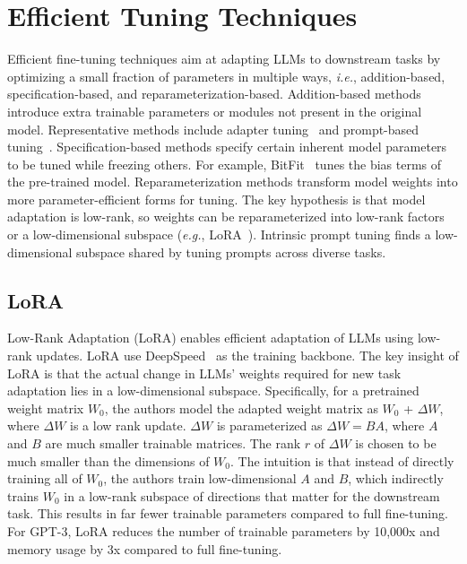 \documentclass[11pt]{article}
\begin{document}
\section{Efficient Tuning Techniques} \label{Efficient_fine-tuning_techniques}

Efficient fine-tuning techniques aim at adapting LLMs to downstream tasks by optimizing a small fraction of parameters in multiple ways, \textit{i.e.}, addition-based, specification-based, and reparameterization-based.
Addition-based methods introduce extra trainable parameters or modules not present in the original model. Representative methods include adapter tuning~\citep{DBLP:conf/icml/HoulsbyGJMLGAG19} and prompt-based tuning~\citep{DBLP:conf/eacl/SchickS21}. Specification-based methods specify certain inherent model parameters to be tuned while freezing others. For example, BitFit~\citep{DBLP:conf/acl/ZakenGR22} tunes the bias terms of the pre-trained model. Reparameterization methods transform model weights into more parameter-efficient forms for tuning. The key hypothesis is that model adaptation is low-rank, so weights can be reparameterized into low-rank factors or a low-dimensional subspace (\textit{e.g.}, LoRA~\citep{hu2021lora}). Intrinsic prompt tuning finds a low-dimensional subspace shared by tuning prompts across diverse tasks. 
\subsection{LoRA}
 Low-Rank Adaptation (LoRA) \cite{hu2021lora} enables efficient adaptation of LLMs using low-rank updates. LoRA use DeepSpeed~\citep{rasley2020deepspeed} as the training backbone.
     The key insight of LoRA is that the actual change in LLMs' weights required for new task adaptation lies in a low-dimensional subspace. 
    Specifically, for a pretrained weight matrix $W_0$, the authors model the adapted weight matrix as $W_0$ + $\Delta W$, where $\Delta W$ is a low rank update. $\Delta W$ is parameterized as $\Delta W = BA$, where $A$ and $B$ are much smaller trainable matrices. The rank $r$ of $\Delta W$ is chosen to be much smaller than the dimensions of $W_0$. 
    The intuition is that instead of directly training all of $W_0$, the authors train low-dimensional $A$ and $B$, which indirectly trains $W_0$ in a low-rank subspace of directions that matter for the downstream task. This results in far fewer trainable parameters compared to full fine-tuning.
    For GPT-3, LoRA reduces the number of trainable parameters by 10,000x and memory usage by 3x compared to full fine-tuning.
\end{document}
